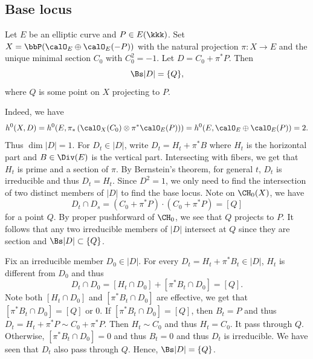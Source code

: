 \subsection{Base locus}

    \begin{example}
        Let $E$ be an elliptic curve and $P \in E(\kkk)$.
        Set $X = \bbP(\calO_E \oplus \calO_E(-P))$ with the natural projection $\pi: X \to E$ and the unique minimal section $C_0$ with $C_0^2 = -1$.
        Let $D = C_0 + \pi^*P$.
        Then 
        \[ \Bs |D| = \{Q\}, \]
        where $Q$ is some point on $X$ projecting to $P$.

        Indeed, we have 
        \[ h^0(X, D) = h^0(E, \pi_*\left(\calO_X(C_0) \otimes \pi^*\calO_E(P) \right)) = h^0(E, \calO_E \oplus \calO_E(P)) = 2. \]
        Thus $\dim |D| = 1$.
        For $D_t \in |D|$, write $D_t = H_t + \pi^*B$ where $H_t$ is the horizontal part and $B \in \Div(E)$ is the vertical part.
        Intersecting with fibers, we get that $H_t$ is prime and a section of $\pi$.
        By Bernstein's theorem, for general $t$, $D_t$ is irreducible and thus $D_t = H_t$.
        Since $D^2 = 1$, we only need to find the intersection of two distinct members of $|D|$ to find the base locus.
        Note on $\CH_0(X)$, we have 
        \[ D_t \cap D_s = (C_0 + \pi^*P) \cdot (C_0 + \pi^*P) = [Q] \]
        for a point $Q$.
        By proper pushforward of $\CH_0$, we see that $Q$ projects to $P$.
        It follows that any two irreducible members of $|D|$ intersect at $Q$ since they are section and $\Bs |D| \subset \{Q\}$.
        
        Fix an irreducible member $D_0 \in |D|$.
        For every $D_t = H_t + \pi^*B_t \in |D|$, $H_t$ is different from $D_0$ and thus 
        \[ D_t \cap D_0 = [H_t \cap D_0] + [\pi^*B_t \cap D_0] = [Q]. \]
        Note both $[H_t \cap D_0]$ and $[\pi^*B_t \cap D_0]$ are effective, we get that $[\pi^*B_t \cap D_0] = [Q]$ or $0$.
        If $[\pi^*B_t \cap D_0] = [Q]$, then $B_t = P$ and thus $D_t = H_t + \pi^*P \sim C_0 + \pi^*P$.
        Then $H_t \sim C_0$ and thus $H_t = C_0$.
        It pass through $Q$.
        Otherwise, $[\pi^*B_t \cap D_0] = 0$ and thus $B_t = 0$ and thus $D_t$ is irreducible.
        We have seen that $D_t$ also pass through $Q$.
        Hence, $\Bs |D| = \{Q\}$.

    \end{example}
    

